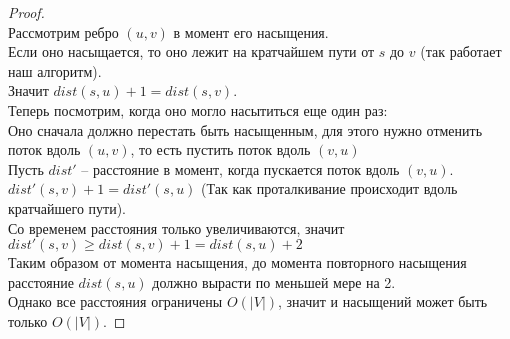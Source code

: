 \begin{proof}\ \\
	Рассмотрим ребро $(u, v)$ в момент его насыщения. \\
	Если оно насыщается, то оно лежит на кратчайшем пути от $s$ до  $v$ (так работает наш алгоритм).\\
	Значит  $dist(s, u) + 1 = dist(s, v).$ \\

	Теперь посмотрим, когда оно могло насытиться еще один раз: \\
	Оно сначала должно перестать быть насыщенным, для этого нужно отменить поток вдоль $(u, v)$, то есть пустить поток вдоль  $(v, u)$ \\
	Пусть  $dist'$ -- расстояние в момент, когда пускается поток вдоль  $(v, u)$. \\
	$dist'(s, v) + 1 = dist'(s, u)$ (Так как проталкивание происходит вдоль кратчайшего пути). \\
	Со временем расстояния только увеличиваются, значит $dist'(s, v) \geq dist(s, v) + 1 = dist(s, u) + 2$ \\
	Таким образом от момента насыщения, до момента повторного насыщения расстояние  $dist(s, u)$ должно вырасти по меньшей мере на 2. \\
	Однако все расстояния ограничены $O(\lvert V \rvert)$, значит и насыщений может быть только $O(\lvert V \rvert)$.
\end{proof}
